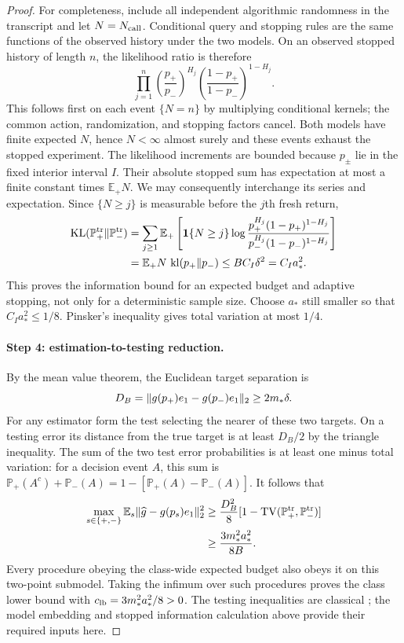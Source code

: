 \documentclass[11pt]{article}
\newcommand{\E}{\mathbb E}
\newcommand{\1}{\mathbf 1}
\DeclarePairedDelimiter{\norm}{\lVert}{\rVert}
\theoremstyle{definition}
\begin{document}
\begin{proof}
For completeness, include all independent algorithmic randomness in the transcript and let $N=N_{\rm call}$. Conditional query and stopping rules are the same functions of the observed history under the two models. On an observed stopped history of length $n$, the likelihood ratio is therefore
\[
 \prod_{j=1}^n
 \left(\frac{p_+}{p_-}\right)^{H_j}
 \left(\frac{1-p_+}{1-p_-}\right)^{1-H_j}.
\]
This follows first on each event $\{N=n\}$ by multiplying conditional kernels; the common action, randomization, and stopping factors cancel. Both models have finite expected $N$, hence $N<\infty$ almost surely and these events exhaust the stopped experiment. The likelihood increments are bounded because $p_\pm$ lie in the fixed interior interval $I$. Their absolute stopped sum has expectation at most a finite constant times $\E_+N$. We may consequently interchange its series and expectation. Since $\{N\ge j\}$ is measurable before the $j$th fresh return,
\begin{align}
 \operatorname{KL}(\mathbb P_+^{\rm tr}\Vert\mathbb P_-^{\rm tr})
 &=\sum_{j\ge1}\E_+\left[\1\{N\ge j\}
 \log\frac{p_+^{H_j}(1-p_+)^{1-H_j}}
 {p_-^{H_j}(1-p_-)^{1-H_j}}\right]\notag\\
 &=\E_+N\,\operatorname{kl}(p_+\Vert p_-)
 \le BC_I\delta^2=C_Ia_*^2.\label{eq:stopped-kl}
\end{align}
This proves the information bound for an expected budget and adaptive stopping, not only for a deterministic sample size. Choose $a_*$ still smaller so that $C_Ia_*^2\le1/8$. Pinsker's inequality gives total variation at most $1/4$.

\paragraph{Step 4: estimation-to-testing reduction.}
By the mean value theorem, the Euclidean target separation is
\[
 D_B=\norm{g(p_+)e_1-g(p_-)e_1}_2
 \ge 2m_*\delta.
\]
For any estimator form the test selecting the nearer of these two targets. On a testing error its distance from the true target is at least $D_B/2$ by the triangle inequality. The sum of the two test error probabilities is at least one minus total variation: for a decision event $A$, this sum is $\mathbb P_+(A^c)+\mathbb P_-(A)=1-[\mathbb P_+(A)-\mathbb P_-(A)]$. It follows that
\begin{align*}
 \max_{s\in\{+,-\}}\E_s\norm{\widehat g-g(p_s)e_1}_2^2
 &\ge\frac{D_B^2}{8}
 [1-\operatorname{TV}(\mathbb P_+^{\rm tr},\mathbb P_-^{\rm tr})]\\
 &\ge\frac{3m_*^2a_*^2}{8B}.
\end{align*}
Every procedure obeying the class-wide expected budget also obeys it on this two-point submodel. Taking the infimum over such procedures proves the class lower bound with $c_{\rm lb}=3m_*^2a_*^2/8>0$. The testing inequalities are classical \citep{tsybakov2009introduction}; the model embedding and stopped information calculation above provide their required inputs here.


\end{proof}
\end{document}
